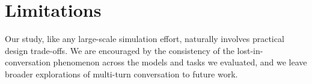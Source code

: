 \documentclass{article}
\begin{document}

\section{Limitations} \label{sec:limitations}

Our study, like any large-scale simulation effort, naturally involves practical design trade-offs. We are encouraged by the consistency of the lost-in-conversation phenomenon across the models and tasks we evaluated, and we leave broader explorations of multi-turn conversation to future work.






\bigskip



\end{document}
